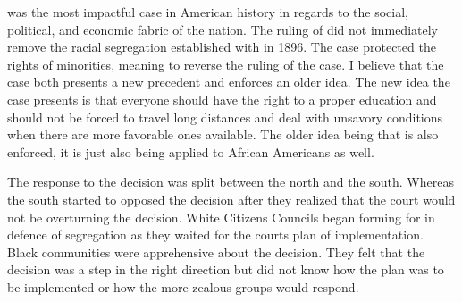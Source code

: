  was the most impactful case in American history in regards to the social, political, and economic fabric of the nation. \autocite{melvin}
The ruling of  did not immediately remove the racial segregation established with  in 1896.
The case protected the rights of minorities, meaning to reverse the ruling of the  case.
I believe that the case both presents a new precedent and enforces an older idea.
The new idea the case presents is that everyone should have the right to a proper education and should not be forced to travel long distances and deal with unsavory conditions when there are more favorable ones available.
The older idea being that  is also enforced, it is just also being applied to African Americans as well.

The response to the decision was split between the north and the south.
 \autocite{melvin}
Whereas the south started to opposed the decision after they realized that the court would not be overturning the decision.
White Citizens Councils began forming for  in defence of segregation as they waited for the courts plan of implementation.
Black communities were apprehensive about the decision.
They felt that the decision was a step in the right direction but did not know how the plan was to be implemented or how the more zealous groups would respond.